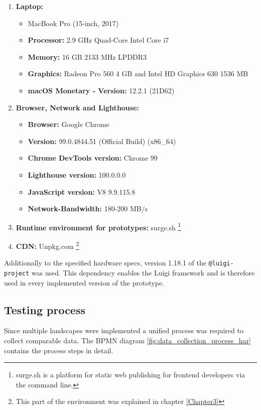 \begin{enumerate}
	\item \textbf{Laptop:}
	\begin{itemize}[noitemsep]
		\item MacBook Pro (15-inch, 2017)
		\item \textbf{Processor:} 2.9 GHz Quad-Core Intel Core i7
		\item \textbf{Memory:} 16 GB 2133 MHz LPDDR3 
		\item \textbf{Graphics:} Radeon Pro 560 4 GB and Intel HD Graphics 630 1536 MB
		\item \textbf{macOS Monetary - Version:} 12.2.1 (21D62)
	\end{itemize} 
	
	\item \textbf{Browser, Network and Lighthouse:}
	\begin{itemize}[noitemsep]
		\item \textbf{Browser:} Google Chrome
		\item \textbf{Version:} 99.0.4844.51 (Official Build) (x86\_64)
		\item \textbf{Chrome DevTools version:} Chrome 99
		\item \textbf{Lighthouse version:} 100.0.0.0
		\item \textbf{JavaScript version:} V8 9.9.115.8
		\item \textbf{Network-Bandwidth:} 180-200 MB/s
	\end{itemize}
	
	\item \textbf{Runtime environment for prototypes:} surge.sh \footnote{surge.sh is a platform for static web publishing
		for frontend developers via the command line.}
	
	\item \textbf{CDN:} Unpkg.com \footnote{This part of the environment was explained in chapter \ref{Chapter3}}
\end{enumerate}

Additionally to the specified hardware specs, version 1.18.1 of the \texttt{@luigi-project} was used. This dependency enables the Luigi framework and is therefore used in every implemented version of the prototype.

\subsection{Testing process}

Since multiple landscapes were implemented a unified process was required to collect comparable data. The BPMN diagram \ref{fig:data_collection_process_har} contains the process steps in detail.

